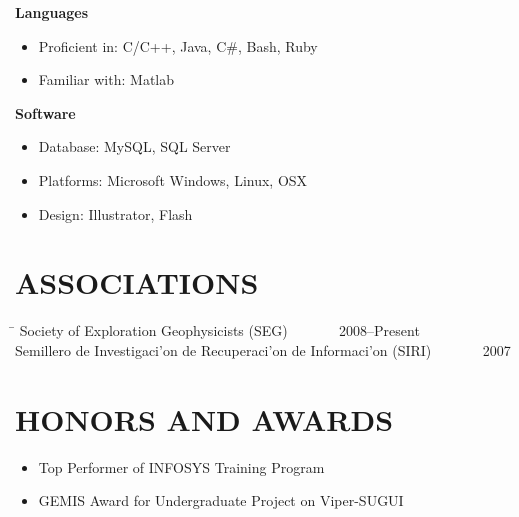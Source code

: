 \documentclass{res}
\begin{document}
\begin{resume}
    \textbf{Languages}\\
	\vspace{-0.1 in}	
    \begin{itemize}
    	\item Proficient in: C/C++, Java, C\#, Bash, Ruby
    	\item Familiar with: Matlab
    \end{itemize}

	\textbf{Software}
	\begin{itemize}
		\item Database: MySQL, SQL Server
		\item Platforms: Microsoft Windows, Linux, OSX
		\item Design: Illustrator, Flash
	\end{itemize} 

\section{ASSOCIATIONS}
    \vspace{0.05 in}    
    \begin{tabbing}
    \hspace{4.9in}\= \kill %
    Society of Exploration Geophysicists (SEG) \> ~~~~~~ 2008--Present\\
    Semillero de Investigaci\a'on de Recuperaci\a'on de Informaci\a'on (SIRI) \> ~~~~~~ 2007\\
    \end{tabbing}\vspace{-15pt}


% 

\section{HONORS AND AWARDS}      
    \begin{itemize}
    	\item Top Performer of INFOSYS Training Program
    	\item GEMIS Award for Undergraduate Project on Viper-SUGUI
    \end{itemize}



\end{resume}
\end{document}
